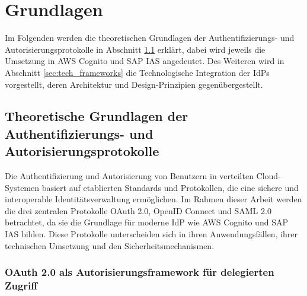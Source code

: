 \chapter{Grundlagen}
\label{grundlagen}
Im Folgenden werden die theoretischen Grundlagen der Authentifizierungs- und Autorisierungsprotokolle in Abschnitt \ref{sec:authen_grundlagen} erklärt, dabei wird jeweils die Umsetzung in \ac{AWS} Cognito und \ac{SAP IAS} angedeutet. Des Weiteren wird in Abschnitt \ref{sec:tech_frameworks} die Technologische Integration der \ac{IdP}s vorgestellt, deren Architektur und Design-Prinzipien gegenübergestellt.

\section{Theoretische Grundlagen der Authentifizierungs- und Autorisierungsprotokolle}
\label{sec:authen_grundlagen}

Die Authentifizierung und Autorisierung von Benutzern in verteilten Cloud-Systemen basiert auf etablierten Standards und Protokollen, die eine sichere und interoperable Identitätsverwaltung ermöglichen. Im Rahmen dieser Arbeit werden die drei zentralen Protokolle OAuth 2.0, OpenID Connect und SAML 2.0 betrachtet, da sie die Grundlage für moderne \ac{IdP} wie \ac{AWS} Cognito und \ac{SAP IAS} bilden. Diese Protokolle unterscheiden sich in ihren Anwendungsfällen, ihrer technischen Umsetzung und den Sicherheitsmechanismen.

\subsection{OAuth 2.0 als Autorisierungsframework für delegierten Zugriff}

